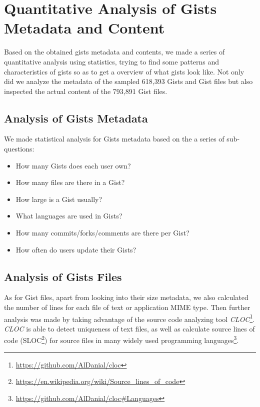 \section{Quantitative Analysis of Gists Metadata and Content}

Based on the obtained gists metadata and contents, we made a series of quantitative analysis using statistics, trying to find some patterns and characteristics of gists so as to get a overview of what gists look like. Not only did we analyze the metadata of the sampled 618,393 Gists and Gist files but also inspected the actual content of the 793,891 Gist files.

\subsection{Analysis of Gists Metadata}

We made statistical analysis for Gists metadata based on the a series of sub-questions:
\begin{itemize}
	\item How many Gists does each user own?

	\item How many files are there in a Gist?

	\item How large is a Gist usually?

	\item What languages are used in Gists?

	\item How many commits/forks/comments are there per Gist?

	\item How often do users update their Gists?
\end{itemize}

\subsection{Analysis of Gists Files}

As for Gist files, apart from looking into their size metadata, we also calculated the number of lines for each file of text or application MIME type. Then further analysis was made by taking advantage of the source code analyzing tool \textit{CLOC}\footnote{\url{https://github.com/AlDanial/cloc}}. \textit{CLOC} is able to detect uniqueness of text files, as well as calculate source lines of code (SLOC\footnote{\url{https://en.wikipedia.org/wiki/Source_lines_of_code}}) for source files in many widely used programming languages\footnote{\url{https://github.com/AlDanial/cloc\#Languages}}. 